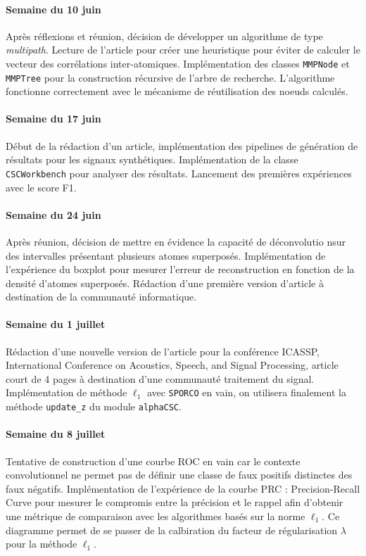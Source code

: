 \documentclass[9pt,a4paper,twoside]{rho}
\begin{document}
\paragraph{Semaine du 10 juin}
Après réflexions et réunion, décision de développer un algorithme de type \textit{multipath}.
Lecture de l'article \cite{triangle_inequalities} pour créer une heuristique pour éviter de calculer le vecteur des corrélations inter-atomiques.
Implémentation des classes \texttt{MMPNode} et \texttt{MMPTree} pour la construction récursive de l'arbre de recherche.
L'algorithme fonctionne correctement avec le mécanisme de réutilisation des noeuds calculés.

\paragraph{Semaine du 17 juin}
Début de la rédaction d'un article, implémentation des pipelines de génération de résultats pour les signaux synthétiques. Implémentation de la classe \texttt{CSCWorkbench} pour analyser des résultats.
Lancement des premières expériences avec le score F1.

\paragraph{Semaine du 24 juin}
Après réunion, décision de mettre en évidence la capacité de déconvolutio nsur des intervalles présentant plusieurs atomes superposés. 
Implémentation de l'expérience du boxplot pour mesurer l'erreur de reconstruction en fonction de la densité d'atomes superposés.
Rédaction d'une première version d'article à destination de la communauté informatique.

\paragraph{Semaine du 1 juillet}
Rédaction d'une nouvelle version de l'article pour la conférence ICASSP, International Conference on Acoustics, Speech, and Signal Processing, article court de 4 pages à destination d'une communauté traitement du signal.
Implémentation de méthode $\ell_1$ avec \texttt{SPORCO} en vain, on utilisera finalement la méthode \texttt{update\_z} du module \texttt{alphaCSC}.

\paragraph{Semaine du 8 juillet}
Tentative de construction d'une courbe ROC en vain car le contexte convolutionnel ne permet pas de définir une classe de faux positifs distinctes des faux négatifs. 
Implémentation de l'expérience de la courbe PRC : Precision-Recall Curve pour mesurer le compromis entre la précision et le rappel afin d'obtenir une métrique de comparaison avec les algorithmes basés sur la norme $\ell_1$.
Ce diagramme permet de se passer de la calbiration du facteur de régularisation $\lambda$ pour la méthode $\ell_1$. 
\end{document}
